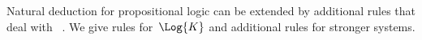 \documentclass[../../../include/open-logic-section]{subfiles}
\begin{document}


Natural deduction for propositional logic can be extended by
additional rules that deal
with~%
. We give rules for~$\Log{K}$ and
additional rules for stronger systems.
\end{document}
